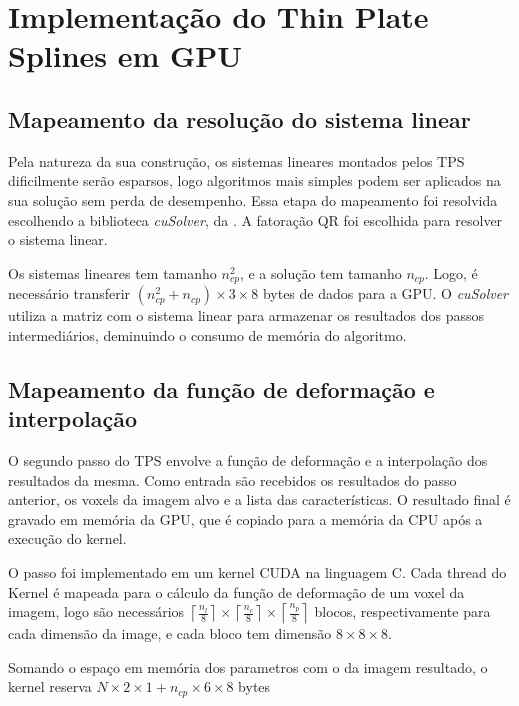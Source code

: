 \section{Implementação do Thin Plate Splines em GPU}

\subsection{Mapeamento da resolução do sistema linear}

  Pela natureza da sua construção, os sistemas lineares montados pelos TPS dificilmente
serão esparsos, logo algoritmos mais simples podem ser aplicados na sua solução
sem perda de desempenho. Essa etapa do mapeamento foi resolvida escolhendo a
biblioteca \textit{cuSolver}, da \cite{cuSolver}. A fatoração QR foi escolhida
para resolver o sistema linear.

  Os sistemas lineares tem tamanho $n_{cp}^2$, e a solução tem tamanho $n_{cp}$.
Logo, é necessário transferir $(n_{cp}^2 + n_{cp}) \times 3 \times 8$ bytes de
dados para a GPU. O \textit{cuSolver} utiliza a matriz com o sistema linear para
armazenar os resultados dos passos intermediários, deminuindo o consumo de memória
do algoritmo.

\subsection{Mapeamento da função de deformação e interpolação}\label{segundoPasso}

  O segundo passo do TPS envolve a função de deformação e a interpolação dos
resultados da mesma. Como entrada são recebidos os resultados do passo anterior,
os voxels da imagem alvo e a lista das características. O resultado final é gravado
em memória da GPU, que é copiado para a memória da CPU após a execução do kernel.

  O passo foi implementado em um kernel CUDA na linguagem C. Cada thread do Kernel
é mapeada para o cálculo da função de deformação de um voxel da imagem, logo são necessários
$\left \lceil{\frac{n_l}{8}}\right \rceil \times
\left \lceil{\frac{n_c}{8}}\right \rceil \times
\left \lceil{\frac{n_p}{8}}\right \rceil$ blocos, respectivamente para
cada dimensão da image, e cada bloco tem dimensão $8 \times 8 \times 8$.

  Somando o espaço em memória dos parametros com o da imagem resultado, o kernel
reserva $N \times 2 \times 1 + n_{cp} \times 6 \times 8$ bytes

